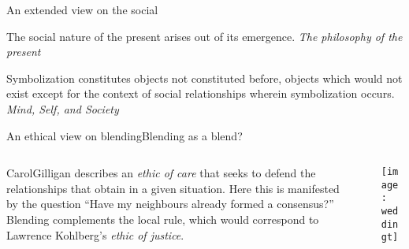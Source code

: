 \begin{frame}{An extended view on the social}{}
{\small The social nature of the present arises out of its emergence. \emph{The philosophy of the present}

\medskip



Symbolization constitutes objects not constituted before, objects which would not exist except for the context of social relationships wherein symbolization occurs.  \emph{Mind, Self, and Society}
} \qquad\qquad {}
\end{frame}

\begin{frame}{An ethical view on blending}{Blending as a blend?}
\begin{columns}[onlytextwidth]
\begin{column}[T]{3in}
{Carol\bsp Gilligan} describes an
\emph{ethic of care} that seeks to defend the
relationships that obtain in a given situation.  Here this is
manifested by the question ``Have my neighbours already formed a
consensus?''  Blending complements the local rule, which would correspond
to Lawrence Kohlberg's \emph{ethic of justice}.
\end{column}
\begin{column}[T]{.1in}
\end{column}
\begin{column}[T]{2in}
\vspace*{.2in}
\texttt{[image: weddingt]}
\end{column}
\end{columns}
\end{frame}

